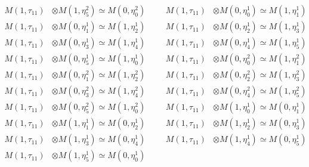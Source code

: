 \begin{align*}
M(1,\tau_{11}) &\otimes M(1,\eta^{2}_{5}) \simeq M(0,\eta^{2}_{0}) &&& M(1,\tau_{11}) &\otimes M(0,\eta^{1}_{0}) \simeq M(1,\eta^{1}_{1})\\
M(1,\tau_{11}) &\otimes M(0,\eta^{1}_{1}) \simeq M(1,\eta^{1}_{2}) &&& M(1,\tau_{11}) &\otimes M(0,\eta^{1}_{2}) \simeq M(1,\eta^{1}_{3})\\
M(1,\tau_{11}) &\otimes M(0,\eta^{1}_{3}) \simeq M(1,\eta^{1}_{4}) &&& M(1,\tau_{11}) &\otimes M(0,\eta^{1}_{4}) \simeq M(1,\eta^{1}_{5})\\
M(1,\tau_{11}) &\otimes M(0,\eta^{1}_{5}) \simeq M(1,\eta^{1}_{0}) &&& M(1,\tau_{11}) &\otimes M(0,\eta^{2}_{0}) \simeq M(1,\eta^{2}_{1})\\
M(1,\tau_{11}) &\otimes M(0,\eta^{2}_{1}) \simeq M(1,\eta^{2}_{2}) &&& M(1,\tau_{11}) &\otimes M(0,\eta^{2}_{2}) \simeq M(1,\eta^{2}_{3})\\
M(1,\tau_{11}) &\otimes M(0,\eta^{2}_{3}) \simeq M(1,\eta^{2}_{4}) &&& M(1,\tau_{11}) &\otimes M(0,\eta^{2}_{4}) \simeq M(1,\eta^{2}_{5})\\
M(1,\tau_{11}) &\otimes M(0,\eta^{2}_{5}) \simeq M(1,\eta^{2}_{0}) &&& M(1,\tau_{11}) &\otimes M(1,\eta^{1}_{0}) \simeq M(0,\eta^{1}_{1})\\
M(1,\tau_{11}) &\otimes M(1,\eta^{1}_{1}) \simeq M(0,\eta^{1}_{2}) &&& M(1,\tau_{11}) &\otimes M(1,\eta^{1}_{2}) \simeq M(0,\eta^{1}_{3})\\
M(1,\tau_{11}) &\otimes M(1,\eta^{1}_{3}) \simeq M(0,\eta^{1}_{4}) &&& M(1,\tau_{11}) &\otimes M(1,\eta^{1}_{4}) \simeq M(0,\eta^{1}_{5})\\
M(1,\tau_{11}) &\otimes M(1,\eta^{1}_{5}) \simeq M(0,\eta^{1}_{0})
\end{align*}

